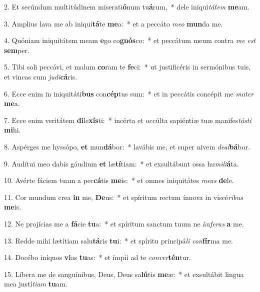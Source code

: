 
2. Et secúndum multitúdinem miserati\textbf{ó}num tu\textbf{á}rum,~* dele iniqui\textit{tá}\textit{tem} \textbf{me}am.

3. Amplius lava me ab iniqui\textbf{tá}te \textbf{me}a:~* et a peccáto \textit{me}\textit{o} \textbf{mun}da me.

4. Quóniam iniquitátem meam \textbf{e}go co\textbf{gnós}co:~* et peccátum meum contra \textit{me} \textit{est} \textbf{sem}per.

5. Tibi soli peccávi, et malum \textbf{co}ram te \textbf{fe}ci:~* ut justificéris in sermónibus tuis, et vincas cum \textit{ju}\textit{di}\textbf{cá}ris.

6. Ecce enim in iniquitáti\textbf{bus} con\textbf{cép}tus sum:~* et in peccátis concépit me \textit{ma}\textit{ter} \textbf{me}a.

7. Ecce enim veritátem \textbf{di}le\textbf{xís}ti:~* incérta et occúlta sapiéntiæ tuæ manifes\textit{tás}\textit{ti} \textbf{mi}hi.

8. Aspérges me hyssópo, \textbf{et} mun\textbf{dá}bor:~* lavábis me, et super nivem \textit{de}\textit{al}\textbf{bá}bor.

9. Audítui meo dabis gáudium \textbf{et} læ\textbf{tí}tiam:~* et exsultábunt ossa hu\textit{mi}\textit{li}\textbf{á}ta.

10. Avérte fáciem tuam a pec\textbf{cá}tis \textbf{me}is:~* et omnes iniquitátes \textit{me}\textit{as} \textbf{de}le.

11. Cor mundum crea \textbf{in} me, \textbf{De}us:~* et spíritum rectum ínnova in viscé\textit{ri}\textit{bus} \textbf{me}is.

12. Ne projícias me a \textbf{fá}cie \textbf{tu}a:~* et spíritum sanctum tuum ne áu\textit{fe}\textit{ras} \textbf{a} me.

13. Redde mihi lætítiam salu\textbf{tá}ris \textbf{tu}i:~* et spíritu principá\textit{li} \textit{con}\textbf{fír}ma me.

14. Docébo iníquos \textbf{vi}as \textbf{tu}as:~* et ímpii ad te \textit{con}\textit{ver}\textbf{tén}tur.

15. Líbera me de sanguínibus, Deus, Deus sa\textbf{lú}tis \textbf{me}æ:~* et exsultábit lingua mea justí\textit{ti}\textit{am} \textbf{tu}am.

